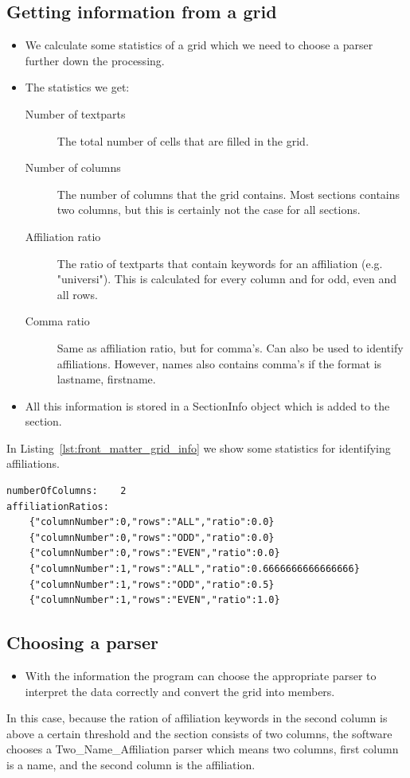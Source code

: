 \documentclass{ou-report}
\begin{document}
\subsection{Getting information from a grid}
\begin{itemize}
    \item We calculate some statistics of a grid which we need to choose a
        parser further down the processing.
    \item The statistics we get:
    \begin{description}
        \item[Number of textparts] The total number of cells that are filled in
            the grid.
        \item[Number of columns] The number of columns that the grid contains.
            Most sections contains two columns, but this is certainly not the 
            case for all sections.
        \item[Affiliation ratio] The ratio of textparts that contain keywords 
            for an affiliation (e.g. "universi"). This is calculated for every 
            column and for odd, even and all rows.
        \item[Comma ratio] Same as affiliation ratio, but for comma's. Can also
            be used to identify affiliations. However, names also contains 
            comma's if the format is lastname, firstname.
    \end{description}
    \item All this information is stored in a SectionInfo object which is added
        to the section.
\end{itemize}
In Listing~\ref{lst:front_matter_grid_info} we show some statistics for 
identifying affiliations.
\begin{lstlisting}[caption={Some derived information from the grid},captionpos=b,label={lst:front_matter_grid_info}]
numberOfColumns:	2
affiliationRatios:
	{"columnNumber":0,"rows":"ALL","ratio":0.0}
	{"columnNumber":0,"rows":"ODD","ratio":0.0}
	{"columnNumber":0,"rows":"EVEN","ratio":0.0}
	{"columnNumber":1,"rows":"ALL","ratio":0.6666666666666666}
	{"columnNumber":1,"rows":"ODD","ratio":0.5}
	{"columnNumber":1,"rows":"EVEN","ratio":1.0}
\end{lstlisting}

\subsection{Choosing a parser}
\begin{itemize}
    \item With the information the program can choose the appropriate parser to
        interpret the data correctly and convert the grid into members.
\end{itemize}
In this case, because the ration of affiliation keywords in the second column is 
above a certain threshold and the section consists of two columns, the software 
chooses a Two\_Name\_Affiliation parser which means two columns, first column is a 
name, and the second column is the affiliation.
\end{document}
